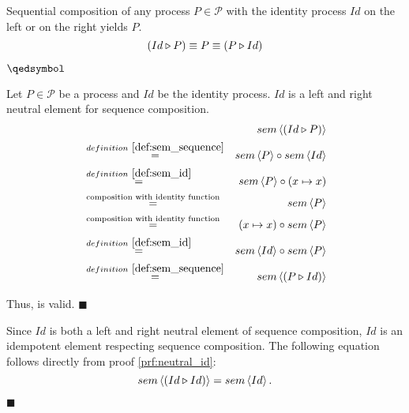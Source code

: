 \begin{theorem}
\label{thm:idempotence_identity}
Sequential composition of any process $P \in \mathcal{P}$ with the identity process $Id$ on the left or on the right yields $P$.
\begin{equation*}
  \left( Id \triangleright P \right) \equiv P \equiv \left( P \triangleright Id \right)
\end{equation*}

\vspace*{-0.75em}
\hfill$\qedsymbol$
\end{theorem}

\begin{myproof}
\label{prf:neutral_id}
Let $P \in \mathcal{P}$ be a process and $Id$ be the identity process. $Id$ is a left and right neutral element for sequence composition.
\begin{eqnarray*}
  & & \sem{\sequence{Id}{P}} \\
    & \overset{\defref{def:sem_sequence}}{=} & \sem{P} \circ \sem{Id} \\
    & \overset{\defref{def:sem_id}}{=} & \sem{P} \circ \left( x \mapsto x \right) \\
    & \overset{\text{composition with identity function}}{=} & \sem{P} \\
    & \overset{\text{composition with identity function}}{=} & \left( x \mapsto x \right) \circ \sem{P} \\
    & \overset{\defref{def:sem_id}}{=} & \sem{Id} \circ \sem{P} \\
    & \overset{\defref{def:sem_sequence}}{=} & \sem{\sequence{P}{Id}} \\
\end{eqnarray*}

\vspace*{-2em}
Thus,  is valid. \hfill$\blacksquare$
\end{myproof}

\clearpage

\begin{corollary}
Since $Id$ is both a left and right neutral element of sequence composition, $Id$ is an idempotent element respecting sequence composition. The following equation follows directly from proof \ref{prf:neutral_id}:
\begin{equation*}
  sem \left\langle \left( Id \triangleright Id \right) \right\rangle = sem \left\langle Id \right\rangle.
\end{equation*}

\hfill$\blacksquare$
\end{corollary}


